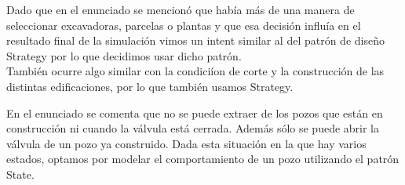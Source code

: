 \par Dado que en el enunciado se mencion\'o que hab\'ia m\'as de una manera de seleccionar excavadoras, parcelas o plantas y que esa decisi\'on influ\'ia en el resultado final de la simulaci\'on vimos un intent similar al del patr\'on de diseño Strategy por lo que decidimos usar dicho patr\'on.\\


Tambi\'en ocurre algo similar con la condici\'ion de corte y la construcci\'on de las distintas edificaciones, por lo que tambi\'en usamos Strategy. \\
\vspace{1cm}


\vspace{1cm}
En el enunciado se comenta que no se puede extraer de los pozos que est\'an en construcci\'on ni cuando la v\'alvula est\'a cerrada. Adem\'as s\'olo se puede abrir la v\'alvula de un pozo ya construido. Dada esta situaci\'on en la que hay varios estados, optamos por modelar el comportamiento de un pozo utilizando el patr\'on State.

\vspace{0.5cm}


